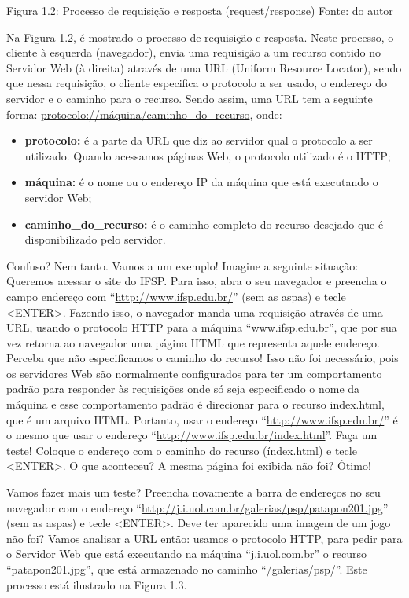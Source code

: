 Figura 1.2: Processo de requisição e resposta (request/response)
Fonte: do autor

Na Figura 1.2, é mostrado o processo de requisição e resposta. Neste processo, o cliente à esquerda (navegador), envia uma requisição a um recurso contido no Servidor Web (à direita) através de uma URL (Uniform Resource Locator), sendo que nessa requisição, o cliente especifica o protocolo a ser usado, o endereço do servidor e o caminho para o recurso. Sendo assim, uma URL tem a seguinte forma: \url{protocolo://máquina/caminho_do_recurso}, onde:

\begin{itemize}

    \item \textbf{protocolo:} é a parte da URL que diz ao servidor qual o protocolo a ser utilizado. Quando acessamos páginas Web, o protocolo utilizado é o HTTP;
    
    \item \textbf{máquina:} é o nome ou o endereço IP da máquina que está executando o servidor Web;
    
    \item \textbf{caminho\_do\_recurso:} é o caminho completo do recurso desejado que é disponibilizado pelo servidor.
    
\end{itemize}

Confuso? Nem tanto. Vamos a um exemplo! Imagine a seguinte situação: Queremos acessar o site do IFSP. Para isso, abra o seu navegador e preencha o campo endereço com ``\url{http://www.ifsp.edu.br/}'' (sem as aspas) e tecle <ENTER>. Fazendo isso, o navegador manda uma requisição através de uma URL, usando o protocolo HTTP para a máquina ``www.ifsp.edu.br'', que por sua vez retorna ao navegador uma página HTML que representa aquele endereço. 
Perceba que não especificamos o caminho do recurso! Isso não foi necessário, pois os servidores Web são normalmente configurados para ter um comportamento padrão para responder às requisições onde só seja especificado o nome da máquina e esse comportamento padrão é direcionar para o recurso index.html, que é um arquivo HTML. Portanto, usar o endereço ``\url{http://www.ifsp.edu.br/}'' é o mesmo que usar o endereço ``\url{http://www.ifsp.edu.br/index.html}''. Faça um teste! Coloque o endereço com o caminho do recurso (índex.html) e tecle <ENTER>. O que aconteceu? A mesma página foi exibida não foi? Ótimo!

Vamos fazer mais um teste? Preencha novamente a barra de endereços no seu navegador com o endereço ``\url{http://j.i.uol.com.br/galerias/psp/patapon201.jpg}'' (sem as aspas) e tecle <ENTER>. Deve ter aparecido uma imagem de um jogo não foi? Vamos analisar a URL então: usamos o protocolo HTTP, para pedir para o Servidor Web que está executando na máquina ``j.i.uol.com.br'' o recurso ``patapon201.jpg'', que está armazenado no caminho ``/galerias/psp/''. Este processo está ilustrado na Figura 1.3.

